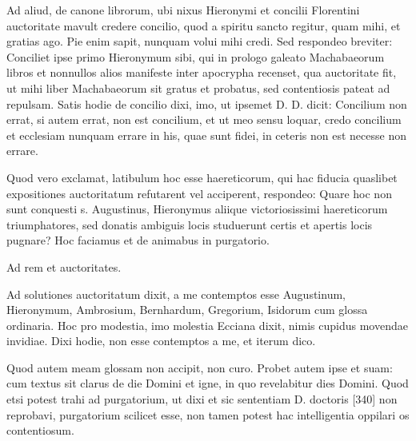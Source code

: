 Ad aliud, de canone librorum, ubi nixus Hieronymi et concilii Florentini auctoritate mavult credere concilio, quod a spiritu sancto regitur, quam mihi, et gratias ago. Pie enim sapit, nunquam volui mihi credi. Sed respondeo breviter: Conciliet ipse primo Hieronymum sibi, qui in prologo galeato Machabaeorum libros et nonnullos alios manifeste inter apocrypha recenset, qua auctoritate fit, ut mihi liber Machabaeorum sit gratus et probatus, sed contentiosis pateat ad repulsam. Satis hodie de concilio dixi, imo, ut ipsemet D. D. dicit: Concilium non errat, si autem errat, non est concilium, et ut meo sensu loquar, credo concilium et ecclesiam nunquam errare in his, quae sunt fidei, in ceteris non est necesse non errare.

Quod vero exclamat, latibulum hoc esse haereticorum, qui hac fiducia quaslibet expositiones auctoritatum refutarent vel acciperent, respondeo: Quare hoc non sunt conquesti s. Augustinus, Hieronymus aliique victoriosissimi haereticorum triumphatores, sed donatis ambiguis locis studuerunt certis et apertis locis pugnare? Hoc faciamus et de animabus in purgatorio.

Ad rem et auctoritates.

Ad solutiones auctoritatum dixit, a me contemptos esse Augustinum, Hieronymum, Ambrosium, Bernhardum, Gregorium, Isidorum cum glossa ordinaria. Hoc pro modestia, imo molestia Ecciana dixit, nimis cupidus movendae invidiae. Dixi hodie, non esse contemptos a me, et iterum dico.

Quod autem meam glossam non accipit, non curo. Probet autem ipse et suam: cum textus sit clarus de die Domini et igne, in quo revelabitur dies Domini. Quod etsi potest trahi ad purgatorium, ut dixi et sic sententiam D. doctoris [340] non reprobavi, purgatorium scilicet esse, non tamen potest hac intelligentia oppilari os contentiosum.

